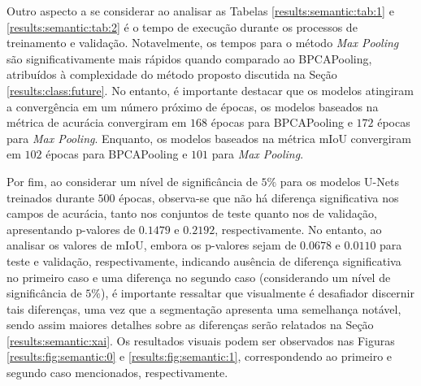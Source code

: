 Outro aspecto a se considerar ao analisar as Tabelas \ref{results:semantic:tab:1} e \ref{results:semantic:tab:2} é o tempo de execução durante os processos de treinamento e validação. Notavelmente, os tempos para o método \textit{Max Pooling} são significativamente mais rápidos quando comparado ao BPCAPooling, atribuídos à complexidade do método proposto discutida na Seção \ref{results:class:future}. No entanto, é importante destacar que os modelos atingiram a convergência em um número próximo de épocas, os modelos baseados na métrica de acurácia convergiram em $168$ épocas para BPCAPooling e $172$ épocas para \textit{Max Pooling}. Enquanto, os modelos baseados na métrica mIoU convergiram em $102$ épocas para BPCAPooling e $101$ para \textit{Max Pooling}.

Por fim, ao considerar um nível de significância de $5\%$ para os modelos U-Nets treinados durante $500$ épocas, observa-se que não há diferença significativa nos campos de acurácia, tanto nos conjuntos de teste quanto nos de validação, apresentando p-valores de $0.1479$ e $0.2192$, respectivamente. No entanto, ao analisar os valores de mIoU, embora os p-valores sejam de $0.0678$ e $0.0110$ para teste e validação, respectivamente, indicando ausência de diferença significativa no primeiro caso e uma diferença no segundo caso (considerando um nível de significância de $5\%$), é importante ressaltar que visualmente é desafiador discernir tais diferenças, uma vez que a segmentação apresenta uma semelhança notável, sendo assim maiores detalhes sobre as diferenças serão relatados na Seção \ref{results:semantic:xai}. Os resultados visuais podem ser observados nas Figuras \ref{results:fig:semantic:0} e \ref{results:fig:semantic:1}, correspondendo ao primeiro e segundo caso mencionados, respectivamente.

